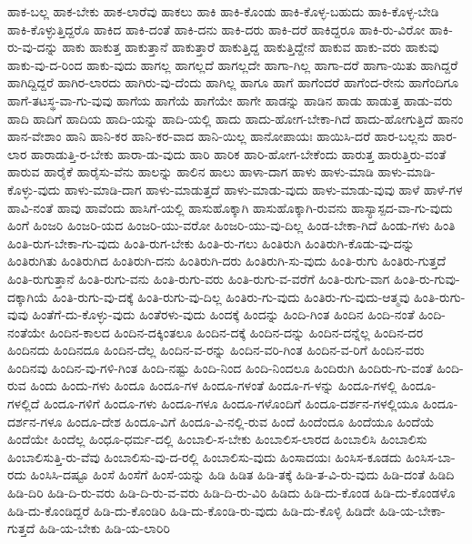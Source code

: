 {ಹಾಕ-ಬಲ್ಲ
ಹಾಕ-ಬೇಕು
ಹಾಕ-ಲಾರೆವು
ಹಾಕಲು
ಹಾಕಿ
ಹಾಕಿ-ಕೊಂಡು
ಹಾಕಿ-ಕೊಳ್ಳ-ಬಹುದು
ಹಾಕಿ-ಕೊಳ್ಳ-ಬೇಡಿ
ಹಾಕಿ-ಕೊಳ್ಳುತ್ತಿದ್ದರೊ
ಹಾಕಿದ
ಹಾಕಿ-ದಂತೆ
ಹಾಕಿ-ದನು
ಹಾಕಿ-ದರು
ಹಾಕಿ-ದರೆ
ಹಾಕಿದ್ದರೂ
ಹಾಕಿ-ರು-ವಿರೋ
ಹಾಕಿ-ರು-ವು-ದನ್ನು
ಹಾಕು
ಹಾಕುತ್ತ
ಹಾಕುತ್ತಾನೆ
ಹಾಕುತ್ತಾರೆ
ಹಾಕುತ್ತಿದ್ದ
ಹಾಕುತ್ತಿದ್ದೇನೆ
ಹಾಕುವ
ಹಾಕು-ವರು
ಹಾಕುವು
ಹಾಕು-ವು-ದ-ರಿಂದ
ಹಾಕು-ವುದು
ಹಾಗಲ್ಲ
ಹಾಗಲ್ಲದೆ
ಹಾಗಲ್ಲದೇ
ಹಾಗಾ-ಗಿಲ್ಲ
ಹಾಗಾ-ದರೆ
ಹಾಗಾ-ಯಿತು
ಹಾಗಿದ್ದರೆ
ಹಾಗಿದ್ದಿದ್ದರೆ
ಹಾಗಿರ-ಲಾರದು
ಹಾಗಿರು-ವು-ದೆಂದು
ಹಾಗಿಲ್ಲ
ಹಾಗೂ
ಹಾಗೆ
ಹಾಗೆಂದರೆ
ಹಾಗೆಂದ-ರೇನು
ಹಾಗೆಂದಿಗೂ
ಹಾಗೆ-ತಟಸ್ಥ-ವಾ-ಗು-ವುವು
ಹಾಗೆಯ
ಹಾಗೆಯೆ
ಹಾಗೆಯೇ
ಹಾಗೇ
ಹಾಡನ್ನು
ಹಾಡಿನ
ಹಾಡು
ಹಾಡುತ್ತ
ಹಾಡು-ವರು
ಹಾದಿ
ಹಾದಿಗೆ
ಹಾದಿಯ
ಹಾದಿ-ಯನ್ನು
ಹಾದಿ-ಯಲ್ಲಿ
ಹಾದು
ಹಾದು-ಹೋಗ-ಬೇಕಾ-ಗಿದೆ
ಹಾದು-ಹೋಗುತ್ತಿದೆ
ಹಾನಂ
ಹಾನ-ವೇಶಾಂ
ಹಾನಿ
ಹಾನಿ-ಕರ
ಹಾನಿ-ಕರ-ವಾದ
ಹಾನಿ-ಯಿಲ್ಲ
ಹಾನೋಪಾಯಃ
ಹಾಯಿಸಿ-ದರೆ
ಹಾರ-ಬಲ್ಲನು
ಹಾರ-ಲಾರ
ಹಾರಾಡುತ್ತಿ-ರ-ಬೇಕು
ಹಾರಾ-ಡು-ವುದು
ಹಾರಿ
ಹಾರಿಕ
ಹಾರಿ-ಹೋಗ-ಬೇಕೆಂದು
ಹಾರುತ್ತ
ಹಾರುತ್ತಿರು-ವಂತೆ
ಹಾರುವ
ಹಾರೈಕೆ
ಹಾರೈಸು-ವೆನು
ಹಾಲನ್ನು
ಹಾಲಿನ
ಹಾಲು
ಹಾಳಾ-ದಾಗ
ಹಾಳು
ಹಾಳು-ಮಾಡಿ
ಹಾಳು-ಮಾಡಿ-ಕೊಳ್ಳು-ವುದು
ಹಾಳು-ಮಾಡಿ-ದಾಗ
ಹಾಳು-ಮಾಡುತ್ತದೆ
ಹಾಳು-ಮಾಡು-ವುದು
ಹಾಳು-ಮಾಡು-ವುವು
ಹಾಳೆ
ಹಾಳೆ-ಗಳ
ಹಾವಿ-ನಂತೆ
ಹಾವು
ಹಾವೆಂದು
ಹಾಸಿಗೆ-ಯಲ್ಲಿ
ಹಾಸುಹೊಕ್ಕಾಗಿ
ಹಾಸುಹೊಕ್ಕಾಗಿ-ರುವನು
ಹಾಸ್ಯಾಸ್ಪದ-ವಾ-ಗು-ವುದು
ಹಿಂಗೆ
ಹಿಂಜರಿ
ಹಿಂಜರಿ-ಯದ
ಹಿಂಜರಿ-ಯು-ವರೋ
ಹಿಂಜರಿ-ಯು-ವು-ದಿಲ್ಲ
ಹಿಂಡ-ಬೇಕಾ-ಗಿದೆ
ಹಿಂಡು-ಗಳು
ಹಿಂತಿ
ಹಿಂತಿ-ರುಗ-ಬೇಕಾ-ಗು-ವುದು
ಹಿಂತಿ-ರುಗ-ಬೇಕು
ಹಿಂತಿ-ರು-ಗಲು
ಹಿಂತಿರುಗಿ
ಹಿಂತಿರುಗಿ-ಕೊಡು-ವು-ದನ್ನು
ಹಿಂತಿರುಗಿತು
ಹಿಂತಿರುಗಿದ
ಹಿಂತಿರುಗಿ-ದನು
ಹಿಂತಿರುಗಿ-ದರು
ಹಿಂತಿರುಗಿ-ಸು-ವುದು
ಹಿಂತಿ-ರುಗು
ಹಿಂತಿರು-ಗುತ್ತದೆ
ಹಿಂತಿ-ರುಗುತ್ತಾನೆ
ಹಿಂತಿ-ರುಗು-ವನು
ಹಿಂತಿ-ರುಗು-ವರು
ಹಿಂತಿ-ರುಗು-ವ-ವರೆಗೆ
ಹಿಂತಿ-ರುಗು-ವಾಗ
ಹಿಂತಿ-ರು-ಗುವು-ದಕ್ಕಾಗಿಯೆ
ಹಿಂತಿ-ರುಗು-ವು-ದಕ್ಕೆ
ಹಿಂತಿ-ರುಗು-ವು-ದಿಲ್ಲ
ಹಿಂತಿರು-ಗು-ವುದು
ಹಿಂತಿರು-ಗು-ವುದು-ಆತ್ಮವು
ಹಿಂತಿ-ರುಗು-ವುವು
ಹಿಂತೆಗೆ-ದು-ಕೊಳ್ಳು-ವುದು
ಹಿಂತೆರಳು-ವುದು
ಹಿಂದಕ್ಕೆ
ಹಿಂದನ್ನು
ಹಿಂದಿ-ಗಿಂತ
ಹಿಂದಿನ
ಹಿಂದಿ-ನಂತೆ
ಹಿಂದಿ-ನಂತೆಯೇ
ಹಿಂದಿನ-ಕಾಲದ
ಹಿಂದಿನ-ದಕ್ಕಿಂತಲೂ
ಹಿಂದಿನ-ದಕ್ಕೆ
ಹಿಂದಿನ-ದನ್ನು
ಹಿಂದಿನ-ದನ್ನೆಲ್ಲ
ಹಿಂದಿನ-ದರ
ಹಿಂದಿನದು
ಹಿಂದಿನದೂ
ಹಿಂದಿನ-ದೆಲ್ಲ
ಹಿಂದಿನ-ವ-ರನ್ನು
ಹಿಂದಿನ-ವರಿ-ಗಿಂತ
ಹಿಂದಿನ-ವ-ರಿಗೆ
ಹಿಂದಿನ-ವರು
ಹಿಂದಿನವು
ಹಿಂದಿನ-ವು-ಗಳಿ-ಗಿಂತ
ಹಿಂದಿ-ನಷ್ಟು
ಹಿಂದಿ-ನಿಂದ
ಹಿಂದಿ-ನಿಂದಲೂ
ಹಿಂದಿರುಗಿ
ಹಿಂದಿರು-ಗು-ವಂತೆ
ಹಿಂದಿ-ರುವ
ಹಿಂದು
ಹಿಂದು-ಗಳು
ಹಿಂದೂ
ಹಿಂದೂ-ಗಳ
ಹಿಂದೂ-ಗಳಂತೆ
ಹಿಂದೂ-ಗ-ಳನ್ನು
ಹಿಂದೂ-ಗಳಲ್ಲಿ
ಹಿಂದೂ-ಗಳಲ್ಲಿದೆ
ಹಿಂದೂ-ಗಳಿಗೆ
ಹಿಂದೂ-ಗಳು
ಹಿಂದೂ-ಗಳೂ
ಹಿಂದೂ-ಗಳೊಂದಿಗೆ
ಹಿಂದೂ-ದರ್ಶನ-ಗಳಲ್ಲಿಯೂ
ಹಿಂದೂ-ದರ್ಶನ-ಗಳೂ
ಹಿಂದೂ-ದೇಶ
ಹಿಂದೂ-ವಿಗೆ
ಹಿಂದೂ-ವಿ-ನಲ್ಲಿ-ರುವ
ಹಿಂದೆ
ಹಿಂದೆಂದೂ
ಹಿಂದೆಯೂ
ಹಿಂದೆಯೆ
ಹಿಂದೆಯೇ
ಹಿಂದೆಲ್ಲ
ಹಿಂಧೂ-ಧರ್ಮ-ದಲ್ಲಿ
ಹಿಂಬಾಲಿ-ಸ-ಬೇಕು
ಹಿಂಬಾಲಿಸ-ಲಾರದ
ಹಿಂಬಾಲಿಸಿ
ಹಿಂಬಾಲಿಸು
ಹಿಂಬಾಲಿಸುತ್ತಿ-ರು-ವೆವು
ಹಿಂಬಾಲಿಸು-ವು-ದ-ರಲ್ಲಿ
ಹಿಂಬಾಲಿಸು-ವುದು
ಹಿಂಸಾದಯಃ
ಹಿಂಸಿಸ-ಕೂಡದು
ಹಿಂಸಿಸ-ಬಾ-ರದು
ಹಿಂಸಿಸಿ-ದಷ್ಟೂ
ಹಿಂಸೆ
ಹಿಂಸೆಗೆ
ಹಿಂಸೆ-ಯನ್ನು
ಹಿಡಿ
ಹಿಡಿತ
ಹಿಡಿ-ತಕ್ಕೆ
ಹಿಡಿ-ತ-ವಿ-ರು-ವುದು
ಹಿಡಿ-ದಂತೆ
ಹಿಡಿದಿ
ಹಿಡಿ-ದಿರಿ
ಹಿಡಿ-ದಿ-ರು-ವರು
ಹಿಡಿ-ದಿ-ರು-ವ-ವರು
ಹಿಡಿ-ದಿ-ರು-ವಿರಿ
ಹಿಡಿದು
ಹಿಡಿ-ದು-ಕೊಂಡ
ಹಿಡಿ-ದು-ಕೊಂಡಳೊ
ಹಿಡಿ-ದು-ಕೊಂಡಿದ್ದರೆ
ಹಿಡಿ-ದು-ಕೊಂಡಿರಿ
ಹಿಡಿ-ದು-ಕೊಂಡಿ-ರು-ವುದು
ಹಿಡಿ-ದು-ಕೊಳ್ಳಿ
ಹಿಡಿದೇ
ಹಿಡಿ-ಯ-ಬೇಕಾ-ಗುತ್ತದೆ
ಹಿಡಿ-ಯ-ಬೇಕು
ಹಿಡಿ-ಯ-ಲಾರಿರಿ
}
